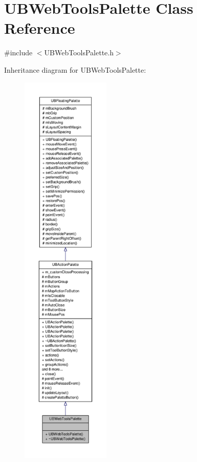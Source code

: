 \hypertarget{class_u_b_web_tools_palette}{\section{U\-B\-Web\-Tools\-Palette Class Reference}
\label{d6/d87/class_u_b_web_tools_palette}
}


{\ttfamily \#include $<$U\-B\-Web\-Tools\-Palette.\-h$>$}



Inheritance diagram for U\-B\-Web\-Tools\-Palette\-:
\nopagebreak
\begin{figure}[H]
\begin{center}
\leavevmode
\includegraphics[height=550pt]{d7/d5b/class_u_b_web_tools_palette__inherit__graph}
\end{center}
\end{figure}


